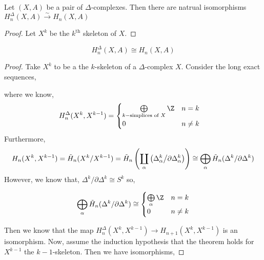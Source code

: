 \documentclass[12pt]{extarticle}
\begin{document}
\begin{theorem}
Let $(X, A)$ be a pair of $\Delta$-complexes. Then there are natrual isomorphisms $H_n^\Delta(X, A) \xrightarrow{\sim} H_n(X, A)$
\end{theorem}

\begin{proof}
Let $X^k$ be the $k^{\mathrm{th}}$ skeleton of $X$. 
\end{proof}


\begin{theorem}
\[ H^{\Delta}_n(X, A) \cong H_n(X, A) \]
\end{theorem}

\begin{proof}
Take $X^k$ to be a the $k$-skeleton of a $\Delta$-complex $X$. Consider the long exact sequences,
\begin{center}
\end{center}
where we know,
\[ H_n^\Delta(X^k, X^{k-1}) = 
\begin{cases}
\bigoplus\limits_{k-\text{simplices of } X} \Z & n = k \quad  \\
0 & n \neq k
\end{cases}\]
Furthermore,
\[ H_n(X^k, X^{k-1}) = \tilde{H}_n(X^k/X^{k-1}) = \tilde{H}_n\left( \coprod_{\alpha} \left( \Delta^k_\alpha \middle/ \partial \Delta_{\alpha}^k \right) \right) \cong \bigoplus_{\alpha} \tilde{H}_n(\Delta^k / \partial \Delta^k) \]
However, we know that, $\Delta^k / \partial \Delta^k \cong S^k$ so,

\[ \bigoplus_{\alpha} \tilde{H}_n(\Delta^k / \partial \Delta^k) \cong \begin{cases}
\bigoplus\limits_{\alpha} \Z & n = k \\
0 & n \neq k
\end{cases} \]
 
Then we know that the map $H_{n}^\Delta(X^k, X^{k-1}) \to H_{n+1}(X^k, X^{k-1})$ is an isomorphism. Now, assume the induction hypothesis that the theorem holds for $X^{k-1}$ the $k-1$-skeleton. Then we have isomorphisms,


\end{proof}
\end{document}
